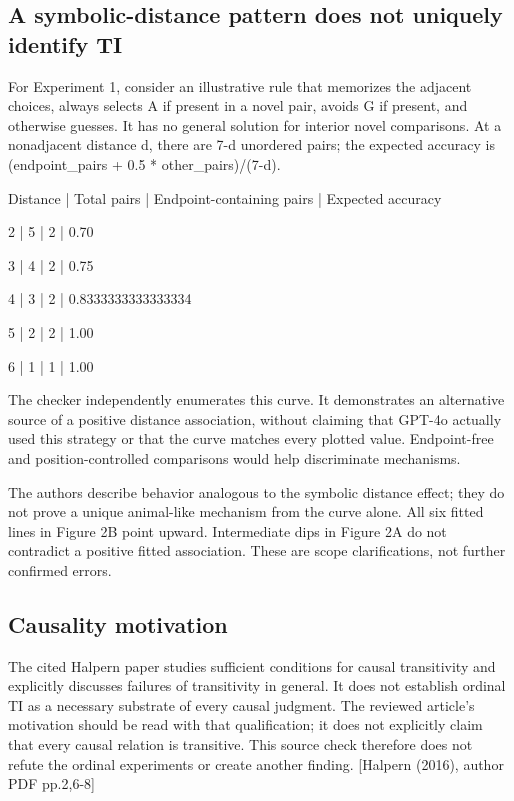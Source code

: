 \documentclass[10pt]{article}
\begin{document}
\subsection*{A symbolic-distance pattern does not uniquely identify TI}
For Experiment 1, consider an illustrative rule that memorizes the adjacent choices, always selects A if present in a novel pair, avoids G if present, and otherwise guesses. It has no general solution for interior novel comparisons. At a nonadjacent distance d, there are 7-d unordered pairs; the expected accuracy is (endpoint\_pairs + 0.5 * other\_pairs)/(7-d).\par
Distance | Total pairs | Endpoint-containing pairs | Expected accuracy\par
2 | 5 | 2 | 0.70\par
3 | 4 | 2 | 0.75\par
4 | 3 | 2 | 0.8333333333333334\par
5 | 2 | 2 | 1.00\par
6 | 1 | 1 | 1.00\par
The checker independently enumerates this curve. It demonstrates an alternative source of a positive distance association, without claiming that GPT-4o actually used this strategy or that the curve matches every plotted value. Endpoint-free and position-controlled comparisons would help discriminate mechanisms.\par
The authors describe behavior analogous to the symbolic distance effect; they do not prove a unique animal-like mechanism from the curve alone. All six fitted lines in Figure 2B point upward. Intermediate dips in Figure 2A do not contradict a positive fitted association. These are scope clarifications, not further confirmed errors.\par
\subsection*{Causality motivation}
The cited Halpern paper studies sufficient conditions for causal transitivity and explicitly discusses failures of transitivity in general. It does not establish ordinal TI as a necessary substrate of every causal judgment. The reviewed article’s motivation should be read with that qualification; it does not explicitly claim that every causal relation is transitive. This source check therefore does not refute the ordinal experiments or create another finding. [Halpern (2016), author PDF pp.2,6-8]\par
\end{document}

